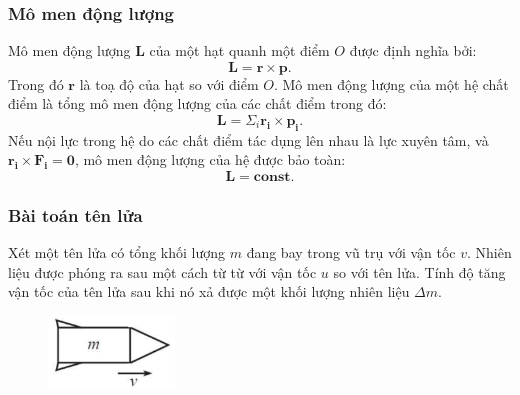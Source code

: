 \begin{frame}
    \frametitle{Mô men động lượng}
    Mô men động lượng \(\mathbf{L}\) của một hạt quanh một điểm \(O\) được định nghĩa bởi:
    \begin{equation}
        \mathbf{L}=\mathbf{r}\times\mathbf{p}.
    \end{equation}
    Trong đó \(\mathbf{r}\) là toạ độ của hạt so với điểm \(O\).
    Mô men động lượng của một hệ chất điểm là tổng mô men động lượng của các chất điểm trong đó:
    \begin{equation}
        \mathbf{L}=\Sigma_i \mathbf{r_i}\times\mathbf{p_i}.
    \end{equation}
    Nếu nội lực trong hệ do các chất điểm tác dụng lên nhau là lực xuyên tâm, và \(\mathbf{r_i}\times\mathbf{F_i}=\mathbf 0\), mô men động lượng của hệ được bảo toàn:
    \begin{equation}
        \mathbf{L}=\textbf{const}.
    \end{equation}
\end{frame}

\begin{frame}
\frametitle{Bài toán tên lửa}
Xét một tên lửa có tổng khối lượng \(m\) đang bay trong vũ trụ với vận tốc \(v\). Nhiên liệu được phóng ra sau một cách từ từ với vận tốc \(u\) so với tên lửa. Tính độ tăng vận tốc của tên lửa sau khi nó xả được một khối lượng nhiên liệu \(\Delta m\).
\vspace{1cm}
\begin{figure}
    \centering
    \includegraphics[width=0.3\textwidth]{Content/Figure/rocket.png}
\end{figure}
\end{frame}


